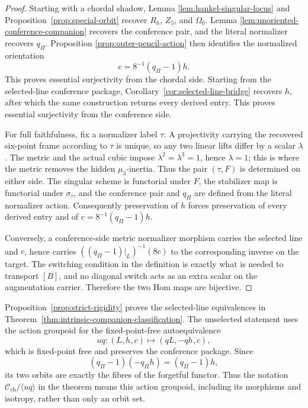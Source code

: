 \documentclass[11pt]{article}
\theoremstyle{definition}
\theoremstyle{remark}
\newcommand{\cC}{\mathscr C}
\begin{document}
\begin{proof}
Starting with a chordal shadow, Lemma
\ref{lem:hankel-singular-locus} and Proposition~\ref{prop:special-orbit}
recover \(R_h\), \(Z_5\), and \(\Omega_0\).  Lemma
\ref{lem:unoriented-conference-companion} recovers the conference pair, and
the literal normalizer recovers \(q_\Pi\).  Proposition
\ref{prop:outer-pencil-action} then identifies the normalized orientation
\[
                      c=8^{-1}(q_\Pi-1)h.
\]
This proves essential surjectivity from the chordal side.  Starting from the
selected-line conference package, Corollary~\ref{cor:selected-line-bridge}
recovers \(h\), after which the same construction returns every derived
entry.  This proves essential surjectivity from the conference side.

For full faithfulness, fix a normalizer label \(\tau\).  A projectivity
carrying the recovered six-point frame according to \(\tau\) is unique, so
any two linear lifts differ by a scalar \(\lambda\).  The metric and the
actual cubic impose \(\lambda^2=\lambda^3=1\), hence \(\lambda=1\); this is
where the metric removes the hidden \(\mu_3\)-inertia.  Thus the pair
\((\tau,F)\) is determined on either side.  The singular scheme is functorial
under \(F\), the stabilizer map is functorial under \(\sigma_\tau\), and the
conference pair and \(q_\Pi\) are defined from the literal normalizer action.
Consequently preservation of \(h\) forces preservation of every derived
entry and of \(c=8^{-1}(q_\Pi-1)h\).

Conversely, a conference-side metric normalizer morphism carries the selected
line and \(c\), hence carries
\(((q_\Pi-1)|_L)^{-1}(8c)\) to the corresponding inverse on the target.
The switching condition in the definition is exactly what is needed to
transport \([B]\), and no diagonal switch acts as an extra scalar on the
augmentation carrier.  Therefore the two Hom maps are bijective.
\end{proof}

Proposition~\ref{prop:strict-rigidity} proves the selected-line equivalences
in Theorem~\ref{thm:intrinsic-companion-classification}.  The unselected
statement uses the action groupoid for the fixed-point-free autoequivalence
\[
                         uq:(L,h,c)\longmapsto(qL,-qh,c),
\]
which is fixed-point free and preserves the conference package.  Since
\[
                  (q_\Pi-1)(-q_\Pi h)=(q_\Pi-1)h,
\]
its two orbits are exactly the fibres of the forgetful functor.  Thus the
notation \(\cC_{\mathrm{ch}}/\langle uq\rangle\) in the theorem means this
action groupoid, including its morphisms and isotropy, rather than only an
orbit set.
\end{document}
